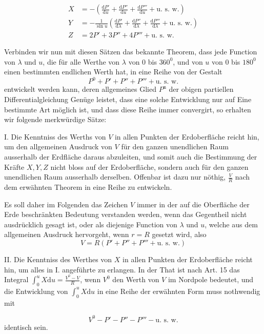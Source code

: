 \par\clearpage
{}
\[
\begin{aligned}
X&=-\left(\frac{\mathrm{d}P'}{\mathrm{d}u}+\frac{\mathrm{d}P''}{\mathrm{d}u}+\frac{\mathrm{d}P'''}{\mathrm{d}u}+\text{u. s. w.}\right)\\
Y&=-\frac1{\sin u}\left(\frac{\mathrm{d}P'}{\mathrm{d}\lambda}+\frac{\mathrm{d}P''}{\mathrm{d}\lambda}+\frac{\mathrm{d}P'''}{\mathrm{d}\lambda}+\text{u. s. w.}\right)\\
Z&=2P'+3P''+4P'''+\text{u. s. w.}
\end{aligned}
\]

Verbinden wir nun mit diesen Sätzen das bekannte Theorem, dass jede Function von $\lambda$ und $u$, die für alle Werthe von $\lambda$ von $0$ bis $360^0$, und von $u$ von $0$ bis $180^0$ einen bestimmten endlichen Werth hat, in eine Reihe von der Gestalt
\[
P^0+P'+P''+P'''+\text{u. s. w.}
\]
entwickelt werden kann, deren allgemeines Glied $P^{\mathrm{n}}$ der obigen partiellen Differentialgleichung Genüge leistet, dass eine solche Entwicklung nur auf Eine bestimmte Art möglich ist, und dass diese Reihe immer convergirt, so erhalten wir folgende merkwürdige Sätze:

I. Die Kenntniss des Werths von $V$ in allen Punkten der Erdoberfläche reicht hin, um den allgemeinen Ausdruck von $V$ für den ganzen unendlichen Raum ausserhalb der Erdfläche daraus abzuleiten, und somit auch die Bestimmung der Kräfte $X,Y,Z$ nicht bloss auf der Erdoberfläche, sondern auch für den ganzen unendlichen Raum ausserhalb derselben. Offenbar ist dazu nur nöthig, $\frac VR$ nach dem erwähnten Theorem in eine Reihe zu entwickeln.

Es soll daher im Folgenden das Zeichen $V$ immer in der auf die Oberfläche der Erde beschränkten Bedeutung verstanden werden, wenn das Gegentheil nicht ausdrücklich gesagt ist, oder als diejenige Function von $\lambda$ und $u$, welche aus dem allgemeinen Ausdruck hervorgeht, wenn $r=R$ gesetzt wird, also
\[
V=R(P'+P''+P'''+\text{u. s. w.})
\]

II. Die Kenntniss des Werthes von $X$ in allen Punkten der Erdoberfläche reicht hin, um alles in I. angeführte zu erlangen. In der That ist nach Art. 15 das Integral $\int_0^u X\mathrm{d}u=\frac{V^0-V}{R}$, wenn $V^0$ den Werth von $V$ im Nordpole bedeutet, und die Entwicklung von $\int_0^u X\mathrm{d}u$ in eine Reihe der erwähnten Form muss nothwendig mit
\par\clearpage
{}
\[
V^0-P'-P''-P'''-\text{u. s. w.}
\]
identisch sein.

